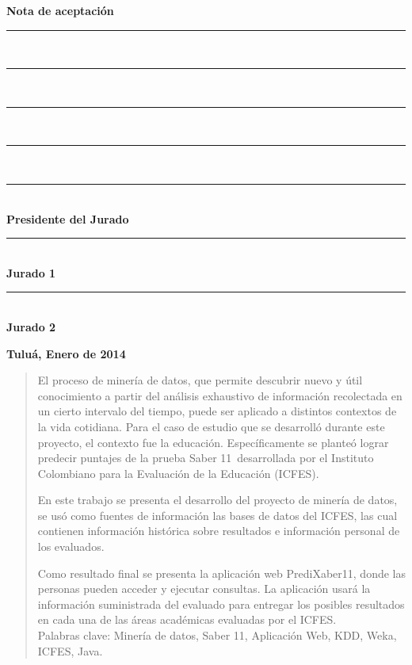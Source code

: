 \thispagestyle{fancy}
\setcounter{page}{3}

\begin{huge}
\textbf{Nota de aceptación}
\end{huge} 
\vfill
\begin{Large}
\begin{flushright}
\rule{100mm}{0.05mm}\\
\rule{100mm}{0.05mm}\\
\rule{100mm}{0.05mm}\\
\rule{100mm}{0.05mm}\\
\rule{100mm}{0.05mm}\\
\textbf{Presidente
del Jurado}\\[2.0cm]
\rule{100mm}{0.05mm}\\\textbf{Jurado 1}\vfill
\rule{100mm}{0.05mm}\\\textbf{Jurado 2}\vfill
\end{flushright}
\begin{flushleft}
\large \textbf{Tuluá, Enero de 2014}
\end{flushleft}
\end{Large}
\newpage


\begin{abstract}
\thispagestyle{fancy}
\setcounter{page}{4}
\justifying
El proceso de minería de datos, que permite descubrir nuevo y útil conocimiento a partir del análisis exhaustivo de información recolectada en un cierto intervalo del tiempo, puede ser aplicado a distintos contextos de la vida cotidiana. Para el caso de estudio que se desarrolló durante este proyecto, el contexto fue la educación. Específicamente se planteó lograr predecir puntajes de la prueba Saber 11\degree \ desarrollada por el Instituto Colombiano para la Evaluación de la Educación (ICFES).

En este trabajo se presenta el desarrollo del proyecto de minería de datos, se usó como fuentes de información las bases de datos del ICFES, las cual contienen información histórica sobre resultados e información personal de los evaluados.

Como resultado final se presenta la aplicación web PrediXaber11, donde las personas pueden acceder y ejecutar consultas. La aplicación usará la información suministrada del evaluado para entregar los posibles resultados en cada una de las áreas académicas evaluadas por el ICFES.\\

Palabras clave: Minería de datos, Saber 11\degree, Aplicación Web, KDD, Weka, ICFES, Java.
\end{abstract}
